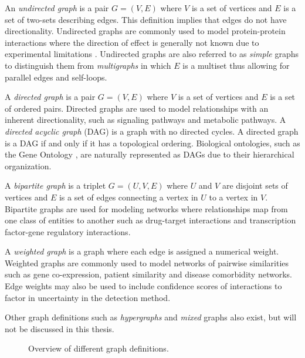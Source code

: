 An \emph{undirected graph} is a pair $G=(V,E)$ where $V$ is a set of vertices and $E$ is a set of two-sets describing edges. This definition implies that edges do not have directionality. Undirected graphs are commonly used to model protein-protein interactions where the direction of effect is generally not known due to experimental limitations \cite{Vinayagam2011}. Undirected graphs are also referred to as \emph{simple} graphs to distinguish them from \emph{multigraphs} in which $E$ is a multiset thus allowing for parallel edges and self-loops.

A \emph{directed graph} is a pair $G=(V,E)$ where $V$ is a set of vertices and $E$ is a set of ordered pairs. Directed graphs are used to model relationships with an inherent directionality, such as signaling pathways and metabolic pathways. A \emph{directed acyclic graph} (DAG) is a graph with no directed cycles. A directed graph is a DAG if and only if it has a topological ordering. Biological ontologies, such as the Gene Ontology \cite{GeneOntology2018}, are naturally represented as DAGs due to their hierarchical organization.

A \emph{bipartite graph} is a triplet $G=(U,V,E)$ where $U$ and $V$ are disjoint sets of vertices and $E$ is a set of edges connecting a vertex in $U$ to a vertex in $V$. Bipartite graphs are used for modeling networks where relationships map from one class of entities to another such as drug-target interactions and transcription factor-gene regulatory interactions.

A \emph{weighted graph} is a graph where each edge is assigned a numerical weight. Weighted graphs are commonly used to model networks of pairwise similarities such as gene co-expression, patient similarity and disease comorbidity networks. Edge weights may also be used to include confidence scores of interactions to factor in uncertainty in the detection method.

\noindent Other graph definitions such as \emph{hypergraphs} and \emph{mixed} graphs also exist, but will not be discussed in this thesis.
%
\begin{figure}
    \centering
    \hfill
    \hfill
    \hfill
    \caption{Overview of different graph definitions.}
    \label{fig:graphtypes}
\end{figure}

